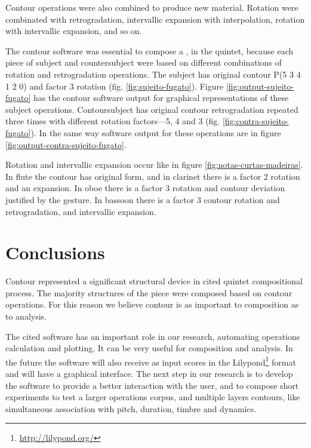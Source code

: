 Contour operations were also combined to produce new
material. Rotation were combinated with retrogradation, intervallic
expansion with interpolation, rotation with intervallic expansion, and
so on.

The contour software was essential to compose a , in the
quintet, because each piece of subject and countersubject were based
on different combinations of rotation and retrogradation operations.
The subject has original contour P(5 3 4 1 2 0) and factor 3 rotation
(fig. \ref{fig:sujeito-fugato}). Figure
\ref{fig:output-sujeito-fugato} has the contour software output for
graphical representations of these subject operations. Contoursubject
has original contour retrogradation repeated three times with
different rotation factors---5, 4 and 3
(fig. \ref{fig:contra-sujeito-fugato}). In the same way software
output for these operations are in figure
\ref{fig:output-contra-sujeito-fugato}.

Rotation and intervallic expansion occur like in figure
\ref{fig:notas-curtas-madeiras}. In flute the contour has original
form, and in clarinet there is a factor 2 rotation and an
expansion. In oboe there is a factor 3 rotation and contour deviation
justified by the gesture. In bassoon there is a factor 3 contour
rotation and retrogradation, and intervallic expansion.

\section{Conclusions}
\label{sec:conclusions}

Contour represented a significant structural device in cited quintet
compositional process. The majority structures of the piece were
composed based on contour operations. For this reason we believe
contour is as important to composition as to analysis.

The cited software has an important role in our research, automating
operations calculation and plotting. It can be very useful for
composition and analysis. In the future the software will also receive
as input scores in the Lilypond\footnote{\url{http://lilypond.org/}}
format and will have a graphical interface.
The next step in our research is to develop the software to provide a
better interaction with the user, and to compose short experiments to
test a larger operations corpus, and multiple layers contours, like
simultaneous association with pitch, duration, timbre and dynamics.

\break

